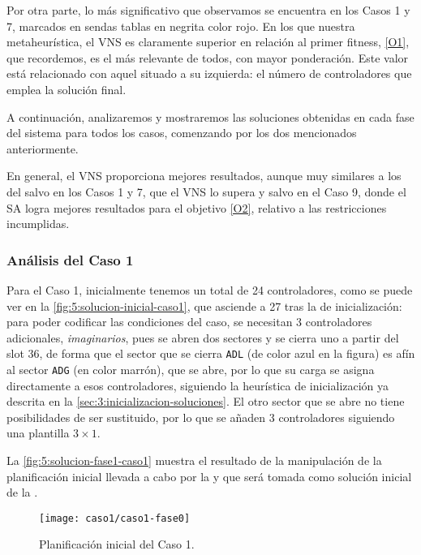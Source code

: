 Por otra parte, lo más significativo que observamos se encuentra en los Casos 1 y 7, marcados en sendas tablas en negrita color rojo. En los que nuestra metaheurística, el VNS es claramente superior en relación al primer fitness, \ref{O1}, que recordemos, es el más relevante de todos, con mayor ponderación. Este valor está relacionado con aquel situado a su izquierda: el número de controladores que emplea la solución final. 

A continuación, analizaremos y mostraremos las soluciones obtenidas en cada fase del sistema para todos los casos, comenzando por los dos mencionados anteriormente.

En general, el VNS proporciona mejores resultados, aunque muy similares a los del salvo en los Casos 1 y 7, que el VNS lo supera y salvo en el Caso 9, donde el SA logra mejores resultados para el objetivo \ref{O2}, relativo a las restricciones incumplidas.

\subsubsection{Análisis del Caso 1}

Para el Caso 1, inicialmente tenemos un total de 24 controladores, como se puede ver en la \autoref{fig:5:solucion-inicial-caso1}, que asciende a 27 tras la \faseuno{} de inicialización: para poder codificar las condiciones del caso, se necesitan 3 controladores adicionales, \textit{imaginarios}, pues se abren dos sectores y se cierra uno a partir del slot 36, de forma que el sector que se cierra \texttt{ADL} (de color azul en la figura) es afín al sector \texttt{ADG} (en color marrón), que se abre, por lo que su carga se asigna directamente a esos controladores, siguiendo la heurística de inicialización ya descrita en la \autoref{sec:3:inicializacion-soluciones}. El otro sector que se abre no tiene posibilidades de ser sustituido, por lo que se añaden 3 controladores siguiendo una plantilla $3\times1$.

La \autoref{fig:5:solucion-fase1-caso1} muestra el resultado de la manipulación de la planificación inicial llevada a cabo por la \faseuno{} y que será tomada como solución inicial de la \fasedos{}.

\begin{figure}
	\centering
	\texttt{[image: caso1/caso1-fase0]}
	\caption{Planificación inicial del Caso 1.}
	\label{fig:5:solucion-inicial-caso1}
\end{figure}

